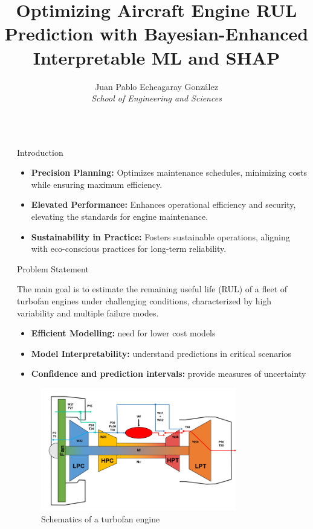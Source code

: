 \documentclass[final, 12pt]{beamer}
\title{Optimizing Aircraft Engine RUL Prediction with Bayesian-Enhanced Interpretable ML and SHAP}
\author{Juan Pablo Echeagaray González \\ \textit{School of Engineering and Sciences}}
\newlength{\sepwidth}
\newlength{\colwidth}
\newlength{\smallcolwidth}
\newcommand{\separatorcolumn}{\begin{column}{\sepwidth}\end{column}}
\begin{document}
\begin{frame}[t]
\begin{columns}[t]
\separatorcolumn

\begin{column}{\smallcolwidth}

    \begin{block}{Introduction}

        \begin{itemize}
            \item \textbf{Precision Planning:} Optimizes maintenance schedules, minimizing costs while ensuring maximum efficiency.
            \item \textbf{Elevated Performance:} Enhances operational efficiency and security, elevating the standards for engine maintenance.
            \item \textbf{Sustainability in Practice:} Fosters sustainable operations, aligning with eco-conscious practices for long-term reliability.
        \end{itemize}

    \end{block}

    \begin{block}{Problem Statement}

        The main goal is to estimate the remaining useful life (RUL) of a ﬂeet of turbofan engines under challenging conditions, characterized by high variability and multiple failure modes.
        \begin{itemize}
            \item \textbf{Efficient Modelling:} need for lower cost models
            \item \textbf{Model Interpretability:} understand predictions in critical scenarios
            \item \textbf{Confidence and prediction intervals:} provide measures of uncertainty
        \end{itemize}

        \begin{figure}
            \centering
            \includegraphics[width=0.8\textwidth]{figures/cmapss_turbofan.png}
            \caption{Schematics of a turbofan engine}
        \end{figure}


\end{block}
\end{column}
\end{columns}
\end{frame}
\end{document}
